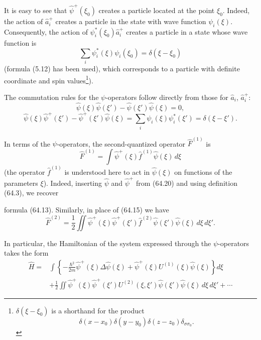 It is easy to see that $\hat\psi^+(\xi_0)$ creates a particle located at the point $\xi_0$. Indeed, the action of $\hat a_i^+$ creates a particle in the state with wave function $\psi_i(\xi)$. Consequently, the action of $\psi_i^*(\xi_0)\hat a_i^+$ creates a particle in a state whose wave function is
\[
 \sum_i\psi_i^*(\xi)\psi_i(\xi_0)=\delta(\xi-\xi_0)
\]
(formula (5.12) has been used), which corresponds to a particle with definite coordinate and spin values\footnote{$\delta(\xi-\xi_0)$ is a shorthand for the product
\[
 \delta(x-x_0)\delta(y-y_0)\delta(z-z_0)\delta_{\sigma\sigma_0}.
\]}).

The commutation rules for the $\psi$-operators follow directly from those for $\hat a_i$, $\hat a_i^+$:
\begin{equation}
 \hat\psi(\xi)\hat\psi(\xi')-\hat\psi(\xi')\hat\psi(\xi)=0,
 \tag{64.21}
\end{equation}
\begin{equation}
 \hat\psi(\xi)\hat\psi^+(\xi')-\hat\psi^+(\xi')\hat\psi(\xi)
 =\sum_i\psi_i(\xi)\psi_i^*(\xi')=\delta(\xi-\xi').
 \tag{64.22}
\end{equation}

In terms of the $\psi$-operators, the second-quantized operator $\hat F^{(1)}$ is
\begin{equation}
 \hat F^{(1)}=\int\hat\psi^+(\xi)\hat f^{(1)}\hat\psi(\xi)\,d\xi
 \tag{64.23}
\end{equation}
(the operator $\hat f^{(1)}$ is understood here to act in $\hat\psi(\xi)$ on functions of the parameters $\xi$). Indeed, inserting $\hat\psi$ and $\hat\psi^+$ from (64.20) and using definition (64.3), we recover

formula (64.13). Similarly, in place of (64.15) we have
\begin{equation}
 \hat F^{(2)}=\frac12\iint\hat\psi^+(\xi)\hat\psi^+(\xi')
 \hat f^{(2)}\hat\psi(\xi')\hat\psi(\xi)\,d\xi\,d\xi'.
 \tag{64.24}
\end{equation}

In particular, the Hamiltonian of the system expressed through the $\psi$-operators takes the form
\begin{equation}
 \begin{aligned}
 \hat H={}&\int\left\{-\frac{\hbar^2}{2m}\hat\psi^+(\xi)
 \Delta\hat\psi(\xi)+\hat\psi^+(\xi)U^{(1)}(\xi)\hat\psi(\xi)\right\}d\xi\\
 &+\frac12\iint\hat\psi^+(\xi)\hat\psi^+(\xi')U^{(2)}(\xi,\xi')
 \hat\psi(\xi')\hat\psi(\xi)\,d\xi\,d\xi'+\cdots
 \end{aligned}
 \tag{64.25}
\end{equation}

